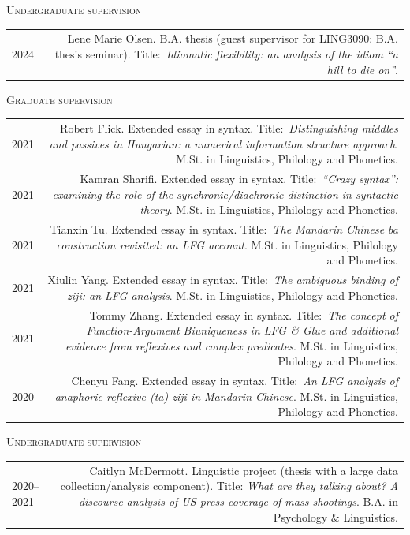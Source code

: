 \documentclass[11pt,a4paper]{article}
\makeatletter
\newlength{\rulelength}%
\newenvironment{cvsection}{%
  \setlength{\extrarowheight}{0.70ex}
  \begin{longtable}[l]{@{} L R @{}}
}{%
  \end{longtable}
}
\newcommand{\cvsubhead}[1]{\noindent\hspace*{\rulelength}\hspace*{9pt} \textsc{#1}\vspace*{0.25\baselineskip}}
\newcommand{\rulesubhead}[1]{\noindent{\color{headercolor}\rule[0.4ex]{\rulelength}{1pt}\hspace*{9pt} {#1}}\vspace*{0.25\baselineskip}}
\makeatother
\begin{document}
\cvsubhead{Undergraduate supervision}

\begin{cvsection}
  2024 & Lene Marie Olsen. B.A. thesis (guest supervisor for LING3090: B.A.
  thesis seminar). Title:~\textit{Idiomatic flexibility: an analysis of the
    idiom ``a hill to die on''}.%
\end{cvsection}

\rulesubhead{University of Oxford}

\cvsubhead{Graduate supervision}

\begin{cvsection}
  2021 & Robert Flick. Extended essay in syntax. Title:~\textit{Distinguishing
    middles and passives in Hungarian: a numerical information structure
    approach}. M.St. in Linguistics, Philology and Phonetics. \\

  2021 & Kamran Sharifi. Extended essay in syntax. Title:~\textit{``Crazy
    syntax'': examining the role of the synchronic/diachronic distinction in
    syntactic theory}. M.St. in Linguistics, Philology and Phonetics.\\

  2021 & Tianxin Tu. Extended essay in syntax. Title:~\textit{The Mandarin
    Chinese \emph{ba} construction revisited: an LFG account}. M.St. in Linguistics, Philology and Phonetics.\\

  2021 & Xiulin Yang. Extended essay in syntax. Title:~\textit{The ambiguous
    binding of \emph{ziji}: an LFG analysis}. M.St. in Linguistics, Philology and Phonetics.\\

  2021 & Tommy Zhang. Extended essay in syntax. Title:~\textit{The concept of
    Function-Argument Biuniqueness in LFG \& Glue and additional evidence
    from reflexives and complex predicates}. M.St. in Linguistics, Philology and Phonetics.\\

  2020 & Chenyu Fang. Extended essay in syntax. Title:~\textit{An LFG analysis
    of anaphoric reflexive \emph{(ta)-ziji} in Mandarin Chinese}. M.St. in
  Linguistics, Philology and Phonetics.
\end{cvsection}

\cvsubhead{Undergraduate supervision}

\begin{cvsection}
  2020--2021 & Caitlyn McDermott. Linguistic project (thesis with a large data
  collection\slash analysis component). Title: \textit{What are they talking about? A discourse analysis of US press coverage of mass shootings}. B.A. in Psychology \& Linguistics.\\
\end{cvsection}
\end{document}

